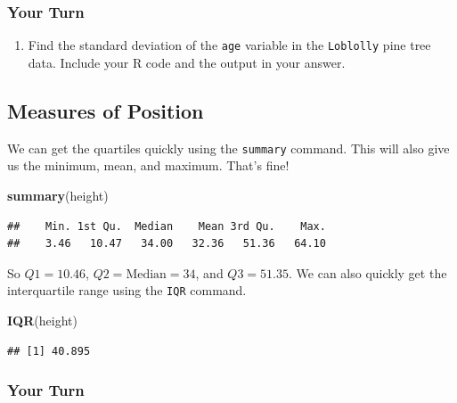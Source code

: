 \documentclass[
]{book}
\newenvironment{Shaded}{\begin{snugshade}}{\end{snugshade}}
\newcommand{\FunctionTok}[1]{\textcolor[rgb]{0.13,0.29,0.53}{\textbf{#1}}}
\newcommand{\NormalTok}[1]{#1}
\providecommand{\tightlist}{%
  \setlength{\itemsep}{0pt}\setlength{\parskip}{0pt}}
\begin{document}
\subsubsection*{Your Turn}\label{your-turn-7}

\begin{enumerate}
\def\labelenumi{\arabic{enumi}.}
\setcounter{enumi}{2}
\tightlist
\item
  Find the standard deviation of the \texttt{age} variable in the \texttt{Loblolly} pine tree data. Include your R code and the output in your answer.
\end{enumerate}

\subsection*{Measures of Position}\label{measures-of-position}

We can get the quartiles quickly using the \texttt{summary} command. This will also give us the minimum, mean, and maximum. That's fine!

\begin{Shaded}
\begin{Highlighting}[]
\FunctionTok{summary}\NormalTok{(height)}
\end{Highlighting}
\end{Shaded}

\begin{verbatim}
##    Min. 1st Qu.  Median    Mean 3rd Qu.    Max. 
##    3.46   10.47   34.00   32.36   51.36   64.10
\end{verbatim}

So \(Q1 = 10.46\), \(Q2 = \text{Median} = 34\), and \(Q3 = 51.35\). We can also quickly get the interquartile range using the \texttt{IQR} command.

\begin{Shaded}
\begin{Highlighting}[]
\FunctionTok{IQR}\NormalTok{(height)}
\end{Highlighting}
\end{Shaded}

\begin{verbatim}
## [1] 40.895
\end{verbatim}

\subsubsection*{Your Turn}\label{your-turn-8}
\end{document}
